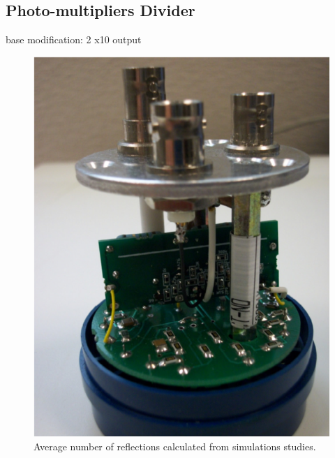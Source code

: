 \subsection{Photo-multipliers Divider}



base modification: 2 x10 output

\begin{figure}
	\centering
	\includegraphics[width=1.0\columnwidth,keepaspectratio]{img/pmtWithDivider.png}
	\caption{Average number of reflections calculated from simulations studies.}
	\label{fig:pmtWithDivider}
\end{figure}
